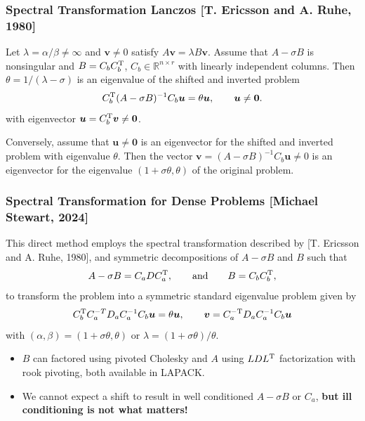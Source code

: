 \documentclass[landscape]{beamer}
\newcommand{\eqand}{\qquad\mbox{and}\qquad}
\renewcommand{\vec}[1]{\bm{#1}}
\newcommand{\T}{{\rm T}}
\begin{document}
\begin{frame}
  \frametitle{Spectral Transformation Lanczos
    [T. Ericsson and A. Ruhe, 1980]}

  \begin{lemma}
    \label{lm:spectral_transformation}
    Let $\lambda = \alpha/\beta \neq \infty$ and $\vec{v}\neq 0$ satisfy
    $A\vec{v} = \lambda B \vec{v}$.  Assume that $A-\sigma B$ is nonsingular and
    $B = C_b C_b^\T$, $C_b \in \mathbb{R}^{n \times r}$ with linearly independent
    columns.  Then $\theta = 1/(\lambda-\sigma)$ is an eigenvalue of
    the shifted and inverted problem
    \begin{equation*}
      C_b^\T (A-\sigma B)^{-1} C_b \vec{u} = \theta \vec{u}, \qquad \vec{u}\neq \vec{0}.
    \end{equation*}
    with eigenvector $\vec{u} = C_b^\T \vec{v}\neq \vec{0}$.

    Conversely, assume that $\vec{u}\neq \vec{0}$ is an eigenvector
    for the shifted and inverted problem with eigenvalue $\theta$.
    Then the vector $\vec{v} = (A - \sigma B)^{-1} C_b \vec{u}\neq 0$
    is an eigenvector for the eigenvalue $(1 + \sigma \theta, \theta)$
    of the original problem.
  \end{lemma}
\end{frame}

\begin{frame}
	\frametitle{Spectral Transformation for Dense Problems [Michael Stewart, 2024]}
	This direct method employs the spectral transformation described by [T. Ericsson and A. Ruhe, 1980], and symmetric decompositions of $A- \sigma B$ and $B$ such that
	\begin{equation*}
		A-\sigma B = C_a D C_a^\T, \eqand B = C_b C_b^\T,
	\end{equation*} 
	to transform the problem into a symmetric standard eigenvalue problem given by
	\begin{equation*}
		C_b^\T C_a^{-T} D_a C_a^{-1} C_b \vec{u} = \theta \vec{u},\qquad 
		\vec{v} = C_a^{-\T} D_a C_a^{-1} C_b \vec{u}
	\end{equation*}
	with $(\alpha, \beta) = (1+\sigma \theta, \theta)$ or $\lambda = (1+\sigma\theta)/\theta$.
	
	\begin{itemize}
		\item $B$ can factored using pivoted Cholesky and $A$ using $LDL^\T$
		factorization with rook pivoting, both available in LAPACK.
		\item We cannot expect a shift to result in well conditioned
		$A-\sigma B$ or $C_a$,  {\bf but ill conditioning is not what matters!}
	\end{itemize}
\end{frame}
\end{document}

